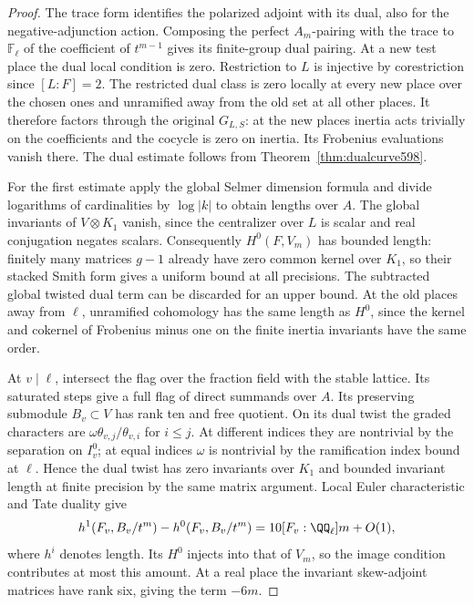 \documentclass[a4paper,11pt]{article}
\theoremstyle{definition}
\theoremstyle{remark}
\numberwithin{equation}{section}
\begin{document}
\begin{proof}
The trace form identifies the polarized adjoint with its
dual, also for the negative-adjunction action. Composing
the perfect \(A_m\)-pairing with the trace to \(\mathbb F_\ell\)
of the coefficient of \(t^{m-1}\) gives its finite-group
dual pairing. At a new test place the dual local condition
is zero. Restriction to \(L\) is injective by
corestriction since \([L:F]=2\). The restricted dual
class is zero locally at every new place over the chosen
ones and unramified away from the old set at all other
places. It therefore factors through the original
\(G_{L,S}\): at the new places inertia acts trivially on
the coefficients and the cocycle is zero on inertia.
Its Frobenius evaluations vanish there. The dual estimate
follows from Theorem~\ref{thm:dualcurve598}.

For the first estimate apply the global Selmer dimension
formula and divide logarithms of cardinalities by
\(\log|k|\) to obtain lengths over \(A\). The global
invariants of \(V\otimes K_1\) vanish, since the centralizer
over \(L\) is scalar and real conjugation negates scalars.
Consequently \(H^0(F,V_m)\) has bounded length: finitely
many matrices \(g-1\) already have zero common kernel
over \(K_1\), so their stacked Smith form gives a uniform
bound at all precisions. The subtracted global twisted
dual term can be discarded for an upper bound. At the old
places away from \(\ell\), unramified cohomology has the
same length as \(H^0\), since the kernel and cokernel of
Frobenius minus one on the finite inertia invariants
have the same order.

At \(v\mid\ell\), intersect the flag over the fraction
field with the stable lattice. Its saturated steps give
a full flag of direct summands over \(A\). Its preserving
submodule \(B_v\subset V\) has rank ten and free quotient.
On its dual twist the graded characters are
\(\omega\theta_{v,j}/\theta_{v,i}\) for \(i\le j\).
At different indices they are nontrivial by the
separation on \(I_v^0\); at equal indices \(\omega\) is
nontrivial by the ramification index bound at \(\ell\).
Hence the dual twist has zero invariants over \(K_1\)
and bounded invariant length at finite precision by the
same matrix argument. Local Euler characteristic and Tate
duality give
\[
  h^1(F_v,B_v/t^m)-h^0(F_v,B_v/t^m)
        =10[F_v:\QQ_\ell]m+O(1),
\]
where \(h^i\) denotes length. Its \(H^0\) injects into that
of \(V_m\), so the image condition contributes at most
this amount. At a real place the invariant skew-adjoint
matrices have rank six, giving the term \(-6m\).


\end{proof}
\end{document}
